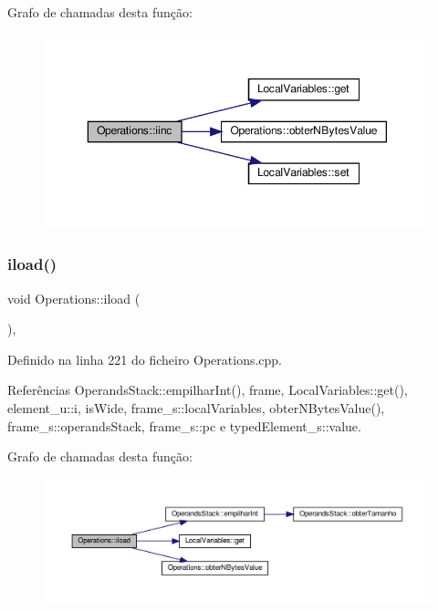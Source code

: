 Grafo de chamadas desta função\+:\nopagebreak
\begin{figure}[H]
\begin{center}
\leavevmode
\includegraphics[width=350pt]{classOperations_a9934f9369192b10a978c7d6950592c42_cgraph}
\end{center}
\end{figure}
\mbox{\label{classOperations_a84e70afc25fa4e54a7e2bffae742222a}} 
\subsubsection{\texorpdfstring{iload()}{iload()}}
{\footnotesize\ttfamily void Operations\+::iload (\begin{DoxyParamCaption}{ }\end{DoxyParamCaption})\hspace{0.3cm}{\ttfamily [static]}, {\ttfamily [private]}}



Definido na linha 221 do ficheiro Operations.\+cpp.



Referências Operands\+Stack\+::empilhar\+Int(), frame, Local\+Variables\+::get(), element\+\_\+u\+::i, is\+Wide, frame\+\_\+s\+::local\+Variables, obter\+N\+Bytes\+Value(), frame\+\_\+s\+::operands\+Stack, frame\+\_\+s\+::pc e typed\+Element\+\_\+s\+::value.

Grafo de chamadas desta função\+:\nopagebreak
\begin{figure}[H]
\begin{center}
\leavevmode
\includegraphics[width=350pt]{classOperations_a84e70afc25fa4e54a7e2bffae742222a_cgraph}
\end{center}
\end{figure}
\mbox{\label{classOperations_a3aba059cf78681767c141d27989fc2aa}} 
